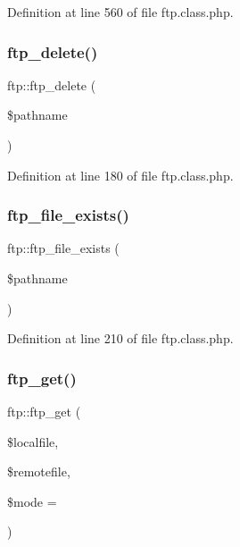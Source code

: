 Definition at line 560 of file ftp.\+class.\+php.

\mbox{\label{classftp_a1eb0184819c272bedac4d8645a36e02a}} 
\subsubsection{\texorpdfstring{ftp\+\_\+delete()}{ftp\_delete()}}
{\footnotesize\ttfamily ftp\+::ftp\+\_\+delete (\begin{DoxyParamCaption}\item[{}]{\$pathname }\end{DoxyParamCaption})}



Definition at line 180 of file ftp.\+class.\+php.

\mbox{\label{classftp_ab1fd207d406a6d97ab82b420cd149143}} 
\subsubsection{\texorpdfstring{ftp\+\_\+file\+\_\+exists()}{ftp\_file\_exists()}}
{\footnotesize\ttfamily ftp\+::ftp\+\_\+file\+\_\+exists (\begin{DoxyParamCaption}\item[{}]{\$pathname }\end{DoxyParamCaption})}



Definition at line 210 of file ftp.\+class.\+php.

\mbox{\label{classftp_a1d7ba9f87f7c5d628876ffe7baf36705}} 
\subsubsection{\texorpdfstring{ftp\+\_\+get()}{ftp\_get()}}
{\footnotesize\ttfamily ftp\+::ftp\+\_\+get (\begin{DoxyParamCaption}\item[{}]{\$localfile,  }\item[{}]{\$remotefile,  }\item[{}]{\$mode = {} }\end{DoxyParamCaption})}



